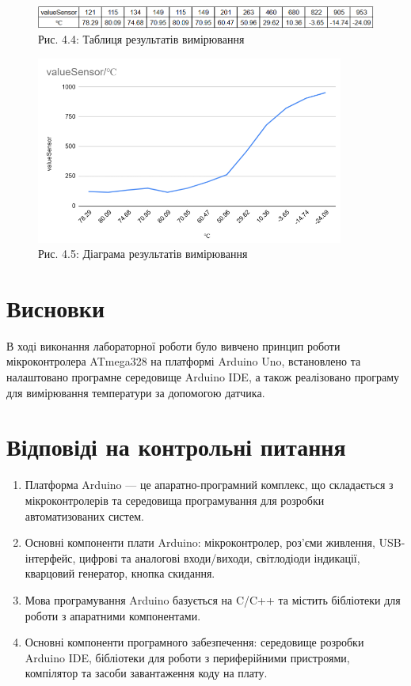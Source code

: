 \documentclass[a4paper]{article}
\begin{document}
\begin{figure}[h]
  \centering
  \includegraphics[width=1\textwidth]{imgs/LW4.2.png}
  \caption*{Рис. 4.4: Таблиця результатів вимірювання}
\end{figure} 


\begin{figure}[h]
  \centering
  \includegraphics[width=0.9\textwidth]{imgs/LW4.3.png}
  \caption*{Рис. 4.5: Діаграма результатів вимірювання}
\end{figure} 


\section*{Висновки}
В ході виконання лабораторної роботи було вивчено принцип роботи мікроконтролера ATmega328 на платформі Arduino Uno, встановлено та налаштовано програмне середовище Arduino IDE, а також реалізовано програму для вимірювання температури за допомогою датчика.

\section*{Відповіді на контрольні питання}
\begin{enumerate}
    \item Платформа Arduino — це апаратно-програмний комплекс, що складається з мікроконтролерів та середовища програмування для розробки автоматизованих систем.
    \item Основні компоненти плати Arduino: мікроконтролер, роз'єми живлення, USB-інтерфейс, цифрові та аналогові входи/виходи, світлодіоди індикації, кварцовий генератор, кнопка скидання.
    \item Мова програмування Arduino базується на C/C++ та містить бібліотеки для роботи з апаратними компонентами.
    \item Основні компоненти програмного забезпечення: середовище розробки Arduino IDE, бібліотеки для роботи з периферійними пристроями, компілятор та засоби завантаження коду на плату.
\end{enumerate}


    
\end{document}
